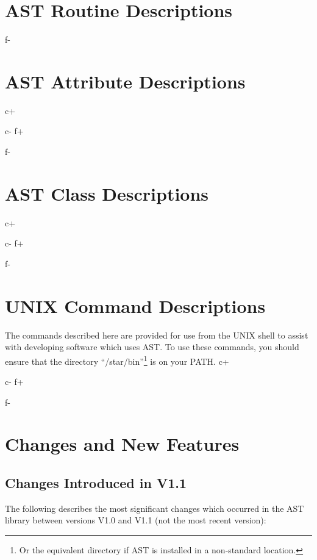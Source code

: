 \documentclass[twoside,11pt]{article}
\newcommand{\xlabel}[1]{}
\begin{document}
\section{\label{ss:functiondescriptions}AST Routine Descriptions}
\small

\normalsize
f-

\cleardoublepage
\section{\label{ss:attributedescriptions}AST Attribute Descriptions}
\small
c+

c-
f+

f-
\normalsize

\cleardoublepage
\section{\label{ss:classdescriptions}AST Class Descriptions}
\small
c+

c-
f+

f-
\normalsize

\cleardoublepage
\section{\label{ss:commanddescriptions}UNIX Command Descriptions}
The commands described here are provided for use from the UNIX shell
to assist with developing software which uses AST. To use these
commands, you should ensure that the directory
``/star/bin''\footnote{Or the equivalent directory if AST is installed
in a non-standard location.} is on your PATH.
\small
c+

c-
f+

f-
\normalsize

\newpage
\section{\xlabel{changes_and_new_features}\label{ss:changes}Changes and New Features}

\subsection{Changes Introduced in V1.1}

The following describes the most significant changes which occurred in
the AST library between versions V1.0 and V1.1 (not the most recent
version):
\end{document}
